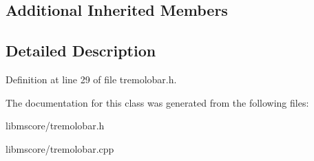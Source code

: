 \subsection*{Additional Inherited Members}


\subsection{Detailed Description}


Definition at line 29 of file tremolobar.\+h.



The documentation for this class was generated from the following files\+:\begin{DoxyCompactItemize}
\item 
libmscore/tremolobar.\+h\item 
libmscore/tremolobar.\+cpp\end{DoxyCompactItemize}
